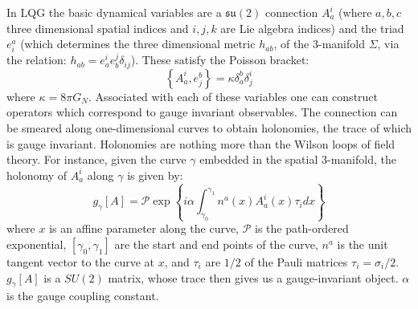\documentclass[submission, Phys]{SciPost}
\newcommand{\mc}[1]{\mathcal{#1}}
\newcommand{\mf}[1]{\mathfrak{#1}}
\begin{document}
In LQG the basic dynamical variables are \cite{Ashtekar2004Background} a $ \mf{su}(2) $ connection $ A_a^i $ (where $ a,b,c $ three dimensional spatial indices and $ i,j,k $ are Lie algebra indices) and the triad  $ e^a_i $ (which determines the three dimensional metric $ h_{ab} $, of the 3-manifold $ \Sigma $, via the relation: $ h_{ab} = e_a^i e_b^j \delta_{ij} $). These satisfy the Poisson bracket:
\begin{equation}\label{eqn:poisson-bracket}
	\left\{ A_a^i, e^b_j \right\} = \kappa \delta^b_a \delta^i_j
\end{equation}
where $ \kappa = 8 \pi G_N $. Associated with each of these variables one can construct operators which correspond to gauge invariant observables. The connection can be smeared along one-dimensional curves to obtain holonomies, the trace of which is gauge invariant. Holonomies are nothing more than the Wilson loops of field theory. For instance, given the curve $ \gamma $ embedded in the spatial 3-manifold, the holonomy of $ A_a^i $ along $ \gamma $ is given by:
\begin{equation}\label{eqn:holonomy}
	g_\gamma[A] = \mc{P} \exp \left\{ i \alpha \int_{\gamma_0}^{\gamma_1} n^a(x) A_a^i(x) \tau_i dx  \right\}
\end{equation}
where $ x $ is an affine parameter along the curve, $ \mc{P} $ is the path-ordered exponential, $ [\gamma_0, \gamma_1] $ are the start and end points of the curve, $ n^a $ is the unit tangent vector to the curve at $ x $, and $ \tau_i $ are $ 1/2 $ of the Pauli matrices $ \tau_i = \sigma_i/2 $. $ g_\gamma[A] $ is a $ SU(2) $ matrix, whose trace then gives us a gauge-invariant object. $ \alpha $ is the gauge coupling constant.
\end{document}
